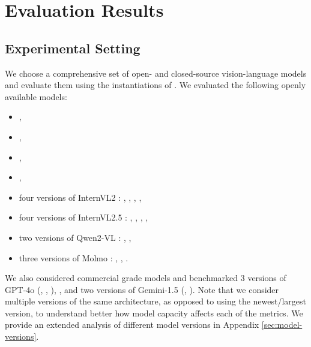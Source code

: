 




\section{Evaluation Results}
\subsection{Experimental Setting}
We choose a comprehensive set of open- and closed-source vision-language models and evaluate them using the instantiations of \mmscore. We evaluated the following openly available models: 
\vspace{-2mm}
\begin{itemize}
    \item 
    \chameleon{} \cite{lu2024chameleon}, 
\vspace{-2mm}
    \item \llavaonevision{} \cite{li2024llava}, 
\vspace{-2mm}
    \item \pixtral{} \cite{agrawal2024pixtral},
\vspace{-2mm}
    \item \phiThreeFive{} \cite{abdin2024phi},
\vspace{-2mm}
    \item four versions of InternVL2 \cite{wang2024enhancing}: \internvlTwoEightB{}, \internvlTwoFourB{}, \internvlTwoTwoB{}, \internvlTwoOneB{}, 
\vspace{-2mm}
    \item four versions of InternVL2.5 \cite{chen2024expanding}: \internvlTwoFiveEightB{}, \internvlTwoFiveFourB{}, \internvlTwoFiveTwoB{}, \internvlTwoFiveOneB{}, 
\vspace{-2mm}
    \item two versions of Qwen2-VL \cite{wang2024qwen2}: \qwenTwoVLTwoB{}, \qwenTwoVLSevenB{}, %
\vspace{-2mm}
    \item three versions of Molmo \cite{deitke2024molmo}: \molmoEOneB{}, \molmoOSevenB{}, \molmoDSevenB{}.
\end{itemize}

We also considered commercial grade models and benchmarked 3 versions of GPT-4o \cite{achiam2023gpt}(\gptFouroFive{}, \gptFouroEight{}, \gptFouroEleven{}), \gptFouroMini{}, and two versions of Gemini-1.5 \cite{reid2024gemini} (\geminiFlash{}, \geminiPro{}). 
Note that we consider multiple versions of the same architecture, as opposed to using the newest/largest version, to understand better how model capacity affects each of the metrics. We provide an extended analysis of different model versions in Appendix \ref{sec:model-versions}. 

